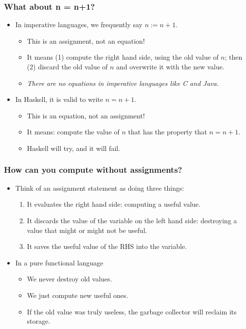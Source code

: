 \documentclass{beamer}
\begin{document}

\begin{frame}
\frametitle{What about n = n+1?}

\begin{itemize}
\item In imperative languages, we frequently say $n := n+1$.
  \begin{itemize}
  \item This is an assignment, not an equation!
  \item It means (1) compute the right hand side, using the old
    value of $n$; then (2) discard the old value of $n$ and
    overwrite it with the new value.
  \item \emph{There are no equations in imperative languages like C
      and Java.}
  \end{itemize}
\item In Haskell, it is valid to write $n = n+1$.
  \begin{itemize}
  \item This is an equation, not an assignment!
  \item It means: compute the value of $n$ that has the property
    that $n = n+1$.
  \item Haskell will try, and it will fail.
\end{itemize}
\end{itemize}

\end{frame}




\begin{frame}
\frametitle{How can you compute without assignments?}

\begin{itemize}
\item Think of an assignment statement as doing three things:
  \begin{enumerate}
  \item It evaluates the right hand side: computing a useful value.
  \item It discards the value of the variable on the left hand
    side: destroying a value that might or might not be useful.
  \item It saves the useful value of the RHS into the variable.
  \end{enumerate}
\item In a pure functional language
  \begin{itemize}
  \item We never destroy old values.
  \item We just compute new useful ones.
  \item If the old value was truly useless, the garbage collector
    will reclaim its storage.
  \end{itemize}
\end{itemize}

\end{frame}
\end{document}

